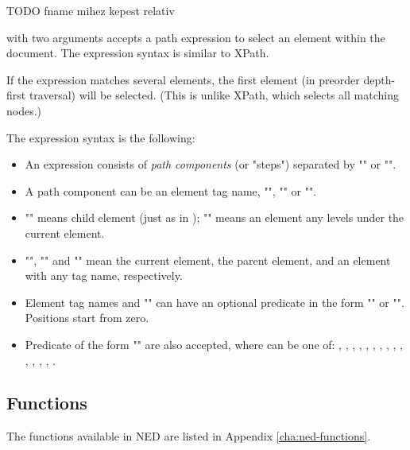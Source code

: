 TODO fname mihez kepest relativ

 with two arguments accepts a path expression
to select an element within the document. The expression syntax is
similar to XPath.

If the expression matches several elements, the first element
(in preorder depth-first traversal) will be selected. (This is
unlike XPath, which selects all matching nodes.)

The expression syntax is the following:
\begin{itemize}
  \item An expression consists of \textit{path components} (or "steps")
        separated by "\ttt{/}" or "\ttt{//}".
  \item A path component can be an element tag name, "\ttt{*}", ""
        or "".
  \item "\ttt{/}" means child element (just as in );
        "\ttt{//}" means an element any levels under the current element.
  \item "", "" and "\ttt{*}" mean the current element,
        the parent element, and an element with any tag name, respectively.
  \item Element tag names and "\ttt{*}" can have an optional predicate
        in the form "\ttt{[position]}" or "\ttt{[@attribute='value']}".
        Positions start from zero.
  \item Predicate of the form "\ttt{[@attribute=\textit{\$param}]}" are also
        accepted, where  can be one of:
        ,
        ,
        ,
        ,
        ,
        ,
        ,
        ,
        ,
        ,
        ,
        ,
        ,
        ,
        .
\end{itemize}

\subsection{Functions}

The functions available in NED are listed in Appendix
\ref{cha:ned-functions}.

